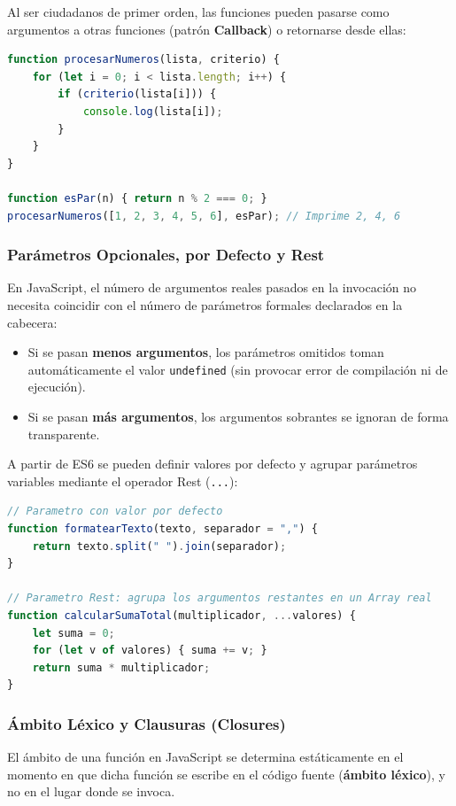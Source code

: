 Al ser ciudadanos de primer orden, las funciones pueden pasarse como argumentos a otras funciones (patrón \textbf{Callback}) o retornarse desde ellas:
\begin{lstlisting}[language=javascript]
function procesarNumeros(lista, criterio) {
    for (let i = 0; i < lista.length; i++) {
        if (criterio(lista[i])) {
            console.log(lista[i]);
        }
    }
}

function esPar(n) { return n % 2 === 0; }
procesarNumeros([1, 2, 3, 4, 5, 6], esPar); // Imprime 2, 4, 6
\end{lstlisting}

\subsubsection{Parámetros Opcionales, por Defecto y Rest}
En JavaScript, el número de argumentos reales pasados en la invocación no necesita coincidir con el número de parámetros formales declarados en la cabecera:
\begin{itemize}
    \item Si se pasan \textbf{menos argumentos}, los parámetros omitidos toman automáticamente el valor \texttt{undefined} (sin provocar error de compilación ni de ejecución).
    \item Si se pasan \textbf{más argumentos}, los argumentos sobrantes se ignoran de forma transparente.
\end{itemize}

A partir de ES6 se pueden definir valores por defecto y agrupar parámetros variables mediante el operador Rest (\texttt{...}):
\begin{lstlisting}[language=javascript]
// Parametro con valor por defecto
function formatearTexto(texto, separador = ",") {
    return texto.split(" ").join(separador);
}

// Parametro Rest: agrupa los argumentos restantes en un Array real
function calcularSumaTotal(multiplicador, ...valores) {
    let suma = 0;
    for (let v of valores) { suma += v; }
    return suma * multiplicador;
}
\end{lstlisting}

\subsubsection{Ámbito Léxico y Clausuras (Closures)}
El ámbito de una función en JavaScript se determina estáticamente en el momento en que dicha función se escribe en el código fuente (\textbf{ámbito léxico}), y no en el lugar donde se invoca.

